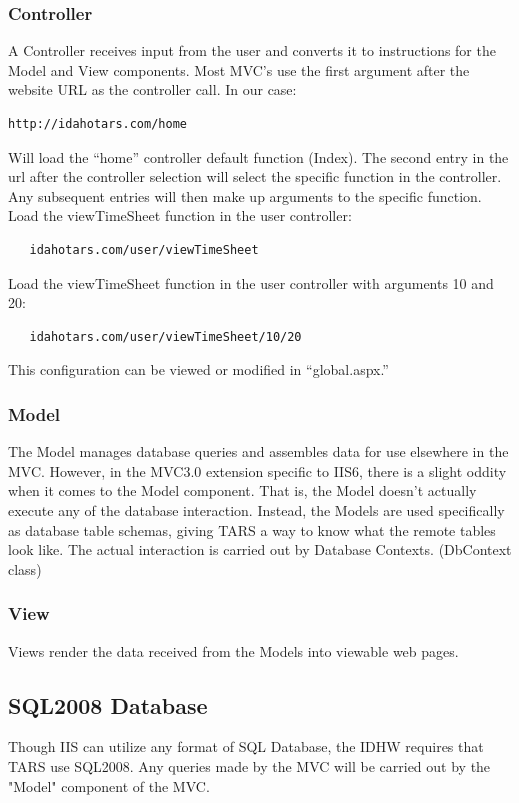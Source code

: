 \documentclass[letterpaper]{article}
\begin{document}
\subsubsection{Controller}
A Controller receives input from the user and converts it to instructions for the Model and View components. Most MVC's use the first argument after the website URL as the controller call. In our case:\\
\begin{verbatim}
http://idahotars.com/home
\end{verbatim}
Will load the ``home'' controller default function (Index). The second entry in the url after the controller selection will select the specific function in the controller. Any subsequent entries will then make up arguments to the specific function.\\
Load the viewTimeSheet function in the user controller:
\begin{verbatim}
   idahotars.com/user/viewTimeSheet 
\end{verbatim}
Load the viewTimeSheet function in the user controller with arguments 10 and 20:
\begin{verbatim}
   idahotars.com/user/viewTimeSheet/10/20
\end{verbatim}
This configuration can be viewed or modified in ``global.aspx.''  

\subsubsection{Model}
The Model manages database queries and assembles data for use elsewhere in the MVC. However, in the MVC3.0 extension specific to IIS6, there is a slight oddity when it comes to the Model component. That is, the Model doesn't actually execute any of the database interaction. Instead, the Models are used specifically as database table schemas, giving TARS a way to know what the remote tables look like. The actual interaction is carried out by Database Contexts. (DbContext class)
\subsubsection{View}
Views render the data received from the Models into viewable web pages.
\subsection{SQL2008 Database}
Though IIS can utilize any format of SQL Database, the IDHW requires that TARS use SQL2008. Any queries made by the MVC will be carried out by the "Model" component of the MVC. \\
\\
\end{document}
